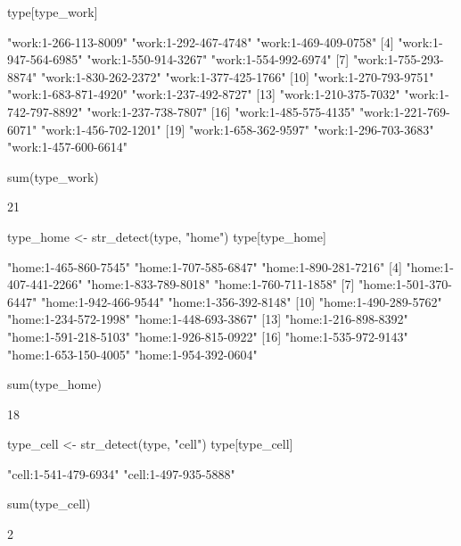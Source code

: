 \documentclass[11pt]{article}\usepackage[]{graphicx}\usepackage[]{color}
\begin{document}
\begin{Schunk}
\begin{Sinput}
type[type_work]
\end{Sinput}
\begin{Soutput}
 [1] "work:1-266-113-8009" "work:1-292-467-4748" "work:1-469-409-0758"
 [4] "work:1-947-564-6985" "work:1-550-914-3267" "work:1-554-992-6974"
 [7] "work:1-755-293-8874" "work:1-830-262-2372" "work:1-377-425-1766"
[10] "work:1-270-793-9751" "work:1-683-871-4920" "work:1-237-492-8727"
[13] "work:1-210-375-7032" "work:1-742-797-8892" "work:1-237-738-7807"
[16] "work:1-485-575-4135" "work:1-221-769-6071" "work:1-456-702-1201"
[19] "work:1-658-362-9597" "work:1-296-703-3683" "work:1-457-600-6614"
\end{Soutput}
\begin{Sinput}
sum(type_work)
\end{Sinput}
\begin{Soutput}
[1] 21
\end{Soutput}
\begin{Sinput}
type_home <- str_detect(type, "home")
type[type_home]
\end{Sinput}
\begin{Soutput}
 [1] "home:1-465-860-7545" "home:1-707-585-6847" "home:1-890-281-7216"
 [4] "home:1-407-441-2266" "home:1-833-789-8018" "home:1-760-711-1858"
 [7] "home:1-501-370-6447" "home:1-942-466-9544" "home:1-356-392-8148"
[10] "home:1-490-289-5762" "home:1-234-572-1998" "home:1-448-693-3867"
[13] "home:1-216-898-8392" "home:1-591-218-5103" "home:1-926-815-0922"
[16] "home:1-535-972-9143" "home:1-653-150-4005" "home:1-954-392-0604"
\end{Soutput}
\begin{Sinput}
sum(type_home)
\end{Sinput}
\begin{Soutput}
[1] 18
\end{Soutput}
\begin{Sinput}
type_cell <- str_detect(type, "cell")
type[type_cell]
\end{Sinput}
\begin{Soutput}
[1] "cell:1-541-479-6934" "cell:1-497-935-5888"
\end{Soutput}
\begin{Sinput}
sum(type_cell)
\end{Sinput}
\begin{Soutput}
[1] 2
\end{Soutput}
\end{Schunk}
\end{document}
